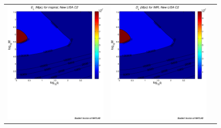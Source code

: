 \documentclass{iopart}
\begin{document}
%
\begin{figure}[htb]
\begin{center}
\begin{tabular}{ccc}
\includegraphics[scale=0.33,clip=true]{FigEmanuele/C2InspDLContour.ps}
&\includegraphics[scale=0.33,clip=true]{FigEmanuele/C2IMRDLContour.ps}

\end{tabular}
\end{center}
\end{figure}
\end{document}
